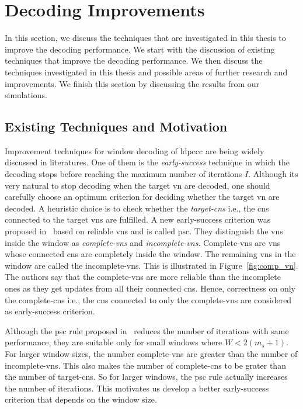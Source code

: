 \section{Decoding Improvements}\label{sec:dec_improve}
In this section, we discuss the techniques that are investigated in this thesis to improve the decoding performance. We start with the discussion of existing techniques that improve the decoding performance. We then discuss the techniques investigated in this thesis and possible areas of further research and improvements. We finish this section by discussing the results from our simulations.

\subsection{Existing Techniques and Motivation}
Improvement techniques for window decoding of \ac{ldpccc} are being widely discussed in literatures. One of them is the \emph{early-success} technique in which the decoding stops before reaching the maximum number of iterations $I$. Although its very natural to stop decoding when the target \ac{vn} are decoded, one should carefully choose an optimum criterion for deciding whether the target \ac{vn} are decoded. A heuristic choice is to check whether the \emph{target-\acp{cn}} i.e., the \acp{cn} connected to the target \acp{vn} are fulfilled. A new early-success criterion was proposed in~\cite{Kang2018} based on reliable \acp{vn} and is called \ac{psc}. They distinguish the \acp{vn} inside the window as \emph{complete-\acp{vn}} and \emph{incomplete-\acp{vn}}. Complete-\acp{vn} are \acp{vn} whose connected \acp{cn} are completely inside the window. The remaining \acp{vn} in the window are called the incomplete-\acp{vn}. This is illustrated in Figure~\ref{fig:comp_vn}. The authors say that the complete-\acp{vn} are more reliable than the incomplete ones as they get updates from all their connected \acp{cn}. Hence, correctness on only the complete-\acp{cn} i.e., the \acp{cn} connected to only the complete-\acp{vn} are considered as early-success criterion.

Although the \ac{psc} rule proposed in~\cite{Kang2018} reduces the number of iterations with same performance, they are suitable only for small windows where $W<2(m_s+1)$. For larger window sizes, the number complete-\acp{vn} are greater than the number of incomplete-\acp{vn}. This also makes the number of complete-\acp{cn} to be grater than the number of target-\acp{cn}. So for larger windows, the \ac{psc} rule actually increases the number of iterations. This motivates us develop a better early-success criterion that depends on the window size.

